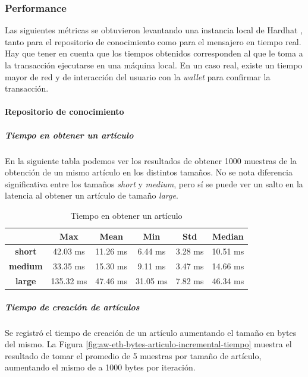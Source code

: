 \subsubsection{Performance\label{performance-blockchain}}

Las siguientes métricas se obtuvieron levantando una instancia local de Hardhat \cite{hardhat}, tanto para el repositorio de conocimiento como para el mensajero en tiempo real. Hay que tener en cuenta que los tiempos obtenidos corresponden al que le toma a la transacción ejecutarse en una máquina local. En un caso real, existe un tiempo mayor de red y de interacción del usuario con la \textit{wallet} para confirmar la transacción.

\paragraph{Repositorio de conocimiento}

\subparagraph{Tiempo en obtener un artículo}

En la siguiente tabla podemos ver los resultados de obtener 1000 muestras de la obtención de un mismo artículo en los distintos tamaños. No se nota diferencia significativa entre los tamaños \textit{short} y \textit{medium}, pero sí se puede ver un salto en la latencia al obtener un artículo de tamaño \textit{large}.

\setlength\tabcolsep{10pt}
\begin{table}[!htbp]
    \centering
    \begin{tabular}{|c|c|c|c|c|c|}
    \hline
    & \textbf{Max} & \textbf{Mean} & \textbf{Min} & \textbf{Std} & \textbf{Median} \\
    \hline
    \textbf{short} & 42.03 ms & 11.26 ms & 6.44 ms & 3.28 ms & 10.51 ms \\
    \hline
    \textbf{medium} & 33.35 ms & 15.30 ms & 9.11 ms & 3.47 ms & 14.66 ms \\
    \hline
    \textbf{large} & 135.32 ms & 47.46 ms & 31.05 ms & 7.82 ms & 46.34 ms \\
    \hline
    \end{tabular}
    \caption{Tiempo en obtener un artículo}
\end{table}

\subparagraph{Tiempo de creación de artículos}

Se registró el tiempo de creación de un artículo aumentando el tamaño en bytes del mismo. La Figura \ref{fig:aw-eth-bytes-articulo-incremental-tiempo} muestra el resultado de tomar el promedio de 5 muestras por tamaño de artículo, aumentando el mismo de a 1000 bytes por iteración.

